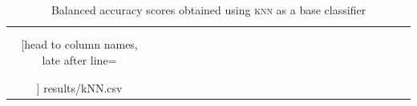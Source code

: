 \documentclass[pmlr]{jmlr}
\begin{document}
\begin{table}
\begin{tabular}{@{}|ccccc|ccccc||ccccc|ccccc||ccc|r|}
	& & & &
	
	\\
	
	&&&&&&&&&&&&&&&&&&&&&&&
	\\\hline\hline
	
	\csvreader[head to column names,
	           late after line=\csvifoddrow{\\}{\\\rowcolor{gray!10!white}},
	           late after last line = \\\hline]
	{results/kNN.csv}{}%
	{
	
	\ereg & \ewei & \ecwei & \enwei & \encwei &
	\eregr & \eweir & \ecweir & \enweir & \encweir &
	\eregos & \eweios & \ecweios & \enweios & \encweios & 
	\eregros & \eweiros & \ecweiros & \enweiros & \encweiros &
	\os & \us & \reg & 
	
	\multicolumn{1}{l|}{\emph{\dataset}}
	
	}%
\end{tabular}
\caption{Balanced accuracy scores obtained using \textsc{knn} as a base classifier}
\end{table}
\end{document}
